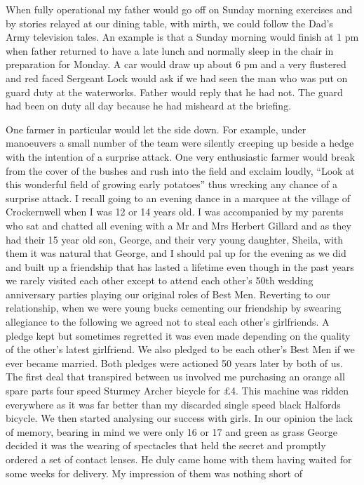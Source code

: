 When fully operational my father would go off on Sunday morning exercises and by
stories relayed at our dining table, with mirth, we could follow the Dad's Army
television tales. An example is that a Sunday morning would finish at 1 pm
when father returned to have a late lunch and normally sleep in the chair in
preparation for Monday. A car would draw up about 6 pm and a very flustered
and red faced Sergeant Lock would ask if we had seen the man who was put on
guard duty at the waterworks. Father would reply that he had not. The guard
had been on duty all day because he had misheard at the briefing.

One farmer in particular would let the side down. For example, under manoeuvers
a small number of the team were silently creeping up beside a hedge with the
intention of a surprise attack. One very enthusiastic farmer would break from
the cover of the bushes and rush into the field and exclaim loudly, ``Look at
this wonderful field of growing early potatoes'' thus wrecking any chance of a
surprise attack. I recall going to an evening dance in a marquee at the village
of Crockernwell when I was 12 or 14 years old. I was accompanied by my parents
who sat and chatted all evening with a Mr and Mrs Herbert Gillard and as they
had their 15 year old son, George, and their very young daughter, Sheila, with
them it was natural that George, and I should pal up for the evening as we did
and built up a friendship that has lasted a lifetime even though in the past
years we rarely visited each other except to attend each other's 50th wedding
anniversary parties playing our original roles of Best Men. Reverting to our
relationship, when we were young bucks cementing our friendship by swearing
allegiance to the following we agreed not to steal each other's girlfriends. A
pledge kept but sometimes regretted it was even made depending on the quality
of the other's latest girlfriend. We also pledged to be each other's Best Men
if we ever became married.  Both pledges were actioned 50 years later by both
of us. The first deal that transpired between us involved me purchasing an
orange all spare parts four speed Sturmey Archer bicycle for £4. This machine
was ridden everywhere as it was far better than my discarded single speed black
Halfords bicycle. We then started analysing our success with girls. In our
opinion the lack of memory, bearing in mind we were only 16 or 17 and green as
grass George decided it was the wearing of spectacles that held the secret and
promptly ordered a set of contact lenses. He duly came home with them having
waited for some weeks for delivery. My impression of them was nothing short of
